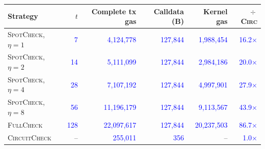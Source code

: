 \begin{tabular}{lrrrrr}
\toprule
Strategy & $t$ & Complete tx gas & Calldata (B) & Kernel gas & ${}\div{}$\textsc{Circ} \\
\midrule
\textsc{SpotCheck}, $\eta{=}1$ & \textcolor{blue}{7} & \textcolor{blue}{4{,}124{,}778} & \textcolor{blue}{127{,}844} & \textcolor{blue}{1{,}988{,}454} & \textcolor{blue}{16.2$\times$} \\
\textsc{SpotCheck}, $\eta{=}2$ & \textcolor{blue}{14} & \textcolor{blue}{5{,}111{,}099} & \textcolor{blue}{127{,}844} & \textcolor{blue}{2{,}984{,}186} & \textcolor{blue}{20.0$\times$} \\
\textsc{SpotCheck}, $\eta{=}4$ & \textcolor{blue}{28} & \textcolor{blue}{7{,}107{,}192} & \textcolor{blue}{127{,}844} & \textcolor{blue}{4{,}997{,}901} & \textcolor{blue}{27.9$\times$} \\
\textsc{SpotCheck}, $\eta{=}8$ & \textcolor{blue}{56} & \textcolor{blue}{11{,}196{,}179} & \textcolor{blue}{127{,}844} & \textcolor{blue}{9{,}113{,}567} & \textcolor{blue}{43.9$\times$} \\
\textsc{FullCheck} & \textcolor{blue}{128} & \textcolor{blue}{22{,}097{,}617} & \textcolor{blue}{127{,}844} & \textcolor{blue}{20{,}237{,}503} & \textcolor{blue}{86.7$\times$} \\
\textsc{CircuitCheck} & -- & \textcolor{blue}{255{,}011} & \textcolor{blue}{356} & -- & \textcolor{blue}{1.0$\times$} \\
\bottomrule
\end{tabular}

